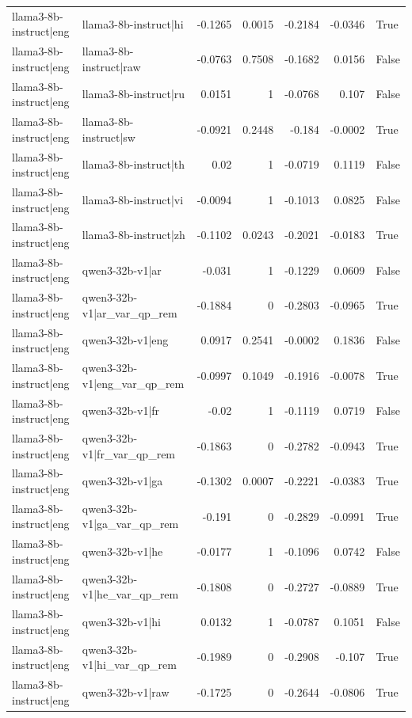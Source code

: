 \begin{table}
\begin{tabular}{l l r r r r l}
llama3-8b-instruct|eng & llama3-8b-instruct|hi & -0.1265 & 0.0015 & -0.2184 & -0.0346 & True \\
llama3-8b-instruct|eng & llama3-8b-instruct|raw & -0.0763 & 0.7508 & -0.1682 & 0.0156 & False \\
llama3-8b-instruct|eng & llama3-8b-instruct|ru & 0.0151 & 1 & -0.0768 & 0.107 & False \\
llama3-8b-instruct|eng & llama3-8b-instruct|sw & -0.0921 & 0.2448 & -0.184 & -0.0002 & True \\
llama3-8b-instruct|eng & llama3-8b-instruct|th & 0.02 & 1 & -0.0719 & 0.1119 & False \\
llama3-8b-instruct|eng & llama3-8b-instruct|vi & -0.0094 & 1 & -0.1013 & 0.0825 & False \\
llama3-8b-instruct|eng & llama3-8b-instruct|zh & -0.1102 & 0.0243 & -0.2021 & -0.0183 & True \\
llama3-8b-instruct|eng & qwen3-32b-v1|ar & -0.031 & 1 & -0.1229 & 0.0609 & False \\
llama3-8b-instruct|eng & qwen3-32b-v1|ar_var_qp_rem & -0.1884 & 0 & -0.2803 & -0.0965 & True \\
llama3-8b-instruct|eng & qwen3-32b-v1|eng & 0.0917 & 0.2541 & -0.0002 & 0.1836 & False \\
llama3-8b-instruct|eng & qwen3-32b-v1|eng_var_qp_rem & -0.0997 & 0.1049 & -0.1916 & -0.0078 & True \\
llama3-8b-instruct|eng & qwen3-32b-v1|fr & -0.02 & 1 & -0.1119 & 0.0719 & False \\
llama3-8b-instruct|eng & qwen3-32b-v1|fr_var_qp_rem & -0.1863 & 0 & -0.2782 & -0.0943 & True \\
llama3-8b-instruct|eng & qwen3-32b-v1|ga & -0.1302 & 0.0007 & -0.2221 & -0.0383 & True \\
llama3-8b-instruct|eng & qwen3-32b-v1|ga_var_qp_rem & -0.191 & 0 & -0.2829 & -0.0991 & True \\
llama3-8b-instruct|eng & qwen3-32b-v1|he & -0.0177 & 1 & -0.1096 & 0.0742 & False \\
llama3-8b-instruct|eng & qwen3-32b-v1|he_var_qp_rem & -0.1808 & 0 & -0.2727 & -0.0889 & True \\
llama3-8b-instruct|eng & qwen3-32b-v1|hi & 0.0132 & 1 & -0.0787 & 0.1051 & False \\
llama3-8b-instruct|eng & qwen3-32b-v1|hi_var_qp_rem & -0.1989 & 0 & -0.2908 & -0.107 & True \\
llama3-8b-instruct|eng & qwen3-32b-v1|raw & -0.1725 & 0 & -0.2644 & -0.0806 & True \\

\end{tabular}
\end{table}
